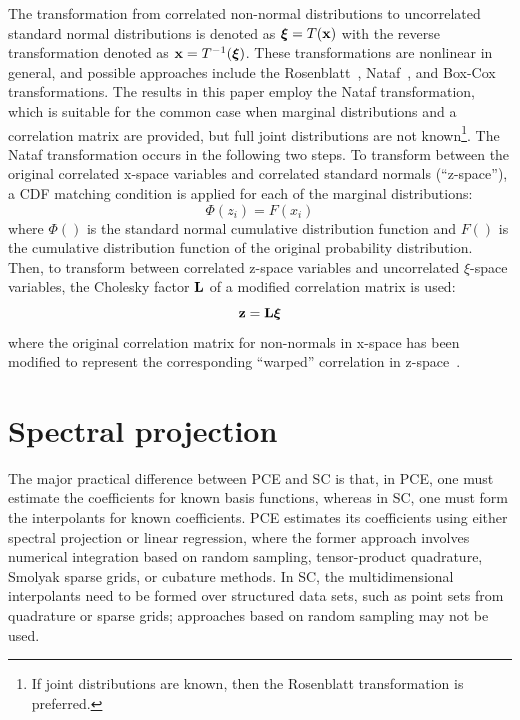 The transformation from correlated non-normal distributions to
uncorrelated standard normal distributions is denoted as
$\boldsymbol{\xi} = T({\bf x})$ with the reverse transformation denoted as
${\bf x} = T^{-1}(\boldsymbol{\xi})$.  These transformations are nonlinear in
general, and possible approaches include the Rosenblatt~\cite{Ros52},
Nataf~\cite{Der86}, and Box-Cox~\cite{Box64} transformations.
The results in this paper employ the Nataf transformation,
which is suitable for the common case when marginal distributions and
a correlation matrix are provided, but full joint distributions are
not known\footnote{If joint distributions are known, then the
Rosenblatt transformation is preferred.}.  The Nataf transformation
occurs in the following two steps.  To transform between the original
correlated x-space variables and correlated standard normals
(``z-space''), a CDF matching condition is applied for each of the
marginal distributions:
\begin{equation}
\Phi(z_i) = F(x_i) %
\end{equation}
where $\Phi()$ is the standard normal cumulative distribution function
and $F()$ is the cumulative distribution function of the original
probability distribution.  Then, to transform between correlated
z-space variables and uncorrelated $\xi$-space variables, the Cholesky
factor ${\bf L}$ of a modified correlation matrix is used:
\begin{equation}
{\bf z} = {\bf L} \boldsymbol{\xi} %
\end{equation}
where the original correlation matrix for non-normals in x-space has
been modified to represent the corresponding ``warped'' correlation in
z-space~\cite{Der86}.


\section{Spectral projection} \label{uq:expansion:spectral}

The major practical difference between PCE and SC is that, in PCE, one
must estimate the coefficients for known basis functions, whereas in
SC, one must form the interpolants for known coefficients.  PCE
estimates its coefficients using either spectral projection or linear
regression, where the former approach involves numerical integration
based on random sampling, tensor-product quadrature, Smolyak sparse
grids, or cubature methods.  In SC, the multidimensional interpolants
need to be formed over structured data sets, such as point sets from
quadrature or sparse grids; approaches based on random sampling may
not be used.  

